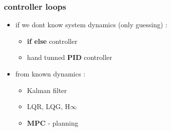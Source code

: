 \documentclass{beamer}
\begin{document}
\begin{frame}
  \frametitle{\bf controller loops}


  \begin{itemize}
    \item if we dont know system dynamics (only guessing) : 
      \begin{itemize}
        \item {\bf{if else}} controller
        \item hand tunned {\bf{PID}} controller
      \end{itemize}
    \item from known dynamics :
      \begin{itemize}
        \item Kalman filter
        \item LQR, LQG, H$\infty$
        \item {\bf{MPC}} - planning
      \end{itemize}
  \end{itemize}

\end{frame}
\end{document}
